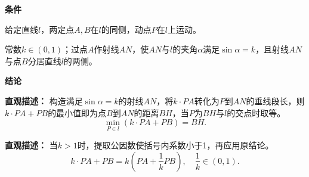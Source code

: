 \begin{statementbox}
	\textbf{\textcolor{CStatement}{条件}}
	\begin{description}[style=nextline, leftmargin=2.8em, labelsep=0.5em, itemsep=0.35em]
		\item[\textbf{\textcolor{CStatement}{条件1（几何场景）：}}]
			给定直线$l$，两定点$A,B$在$l$的同侧，动点$P$在$l$上运动。
		\item[\textbf{\textcolor{CStatement}{条件2（参数构造）：}}]
			常数$k\in(0,1)$；过点$A$作射线$AN$，使$AN$与$l$的夹角$\alpha$满足$\sin\alpha=k$，且射线$AN$与点$B$分居直线$l$的两侧。
	\end{description}
	\textbf{\textcolor{CStatement}{结论}}
	\begin{description}[style=nextline, leftmargin=2.8em, labelsep=0.5em, itemsep=0.45em]
		\item[\textbf{\textcolor{CStatement}{结论一（构造转化）：}}]
			\textbf{\textcolor{CStatement}{直观描述：}}
			构造满足$\sin\alpha=k$的射线$AN$，将$k\cdot PA$转化为$P$到$AN$的垂线段长，则$k\cdot PA+PB$的最小值即为点$B$到$AN$的距离$BH$，当$P$为$BH$与$l$的交点时取等。
			\[
				\min_{P\in l}(k\cdot PA+PB)=BH.
			\]
		\item[\textbf{\textcolor{CStatement}{推广结论（系数调整）：}}]
			\textbf{\textcolor{CStatement}{直观描述：}}
			当$k>1$时，提取公因数使括号内系数小于1，再应用原结论。
			\[
				k\cdot PA+PB = k\left(PA+\frac{1}{k}PB\right),\quad \frac{1}{k}\in(0,1).
			\]
	\end{description}

\end{statementbox}
